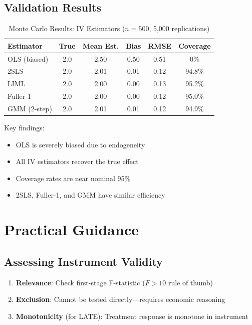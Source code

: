 \subsection{Validation Results}

\begin{table}[ht]
\centering
\caption{Monte Carlo Results: IV Estimators ($n=500$, 5,000 replications)}
\label{tab:iv_mc}
\begin{tabular}{lccccc}
\toprule
\textbf{Estimator} & \textbf{True} & \textbf{Mean Est.} & \textbf{Bias} & \textbf{RMSE} & \textbf{Coverage} \\
\midrule
OLS (biased) & 2.0 & 2.50 & 0.50 & 0.51 & 0\% \\
2SLS & 2.0 & 2.01 & 0.01 & 0.12 & 94.8\% \\
LIML & 2.0 & 2.00 & 0.00 & 0.13 & 95.2\% \\
Fuller-1 & 2.0 & 2.00 & 0.00 & 0.12 & 95.0\% \\
GMM (2-step) & 2.0 & 2.01 & 0.01 & 0.12 & 94.9\% \\
\bottomrule
\end{tabular}
\end{table}

Key findings:
\begin{itemize}
    \item OLS is severely biased due to endogeneity
    \item All IV estimators recover the true effect
    \item Coverage rates are near nominal 95\%
    \item 2SLS, Fuller-1, and GMM have similar efficiency
\end{itemize}


\section{Practical Guidance}
\label{sec:iv_guidance}

\subsection{Assessing Instrument Validity}

\begin{enumerate}
    \item \textbf{Relevance}: Check first-stage F-statistic ($F > 10$ rule of thumb)
    \item \textbf{Exclusion}: Cannot be tested directly---requires economic reasoning
    \item \textbf{Monotonicity} (for LATE): Treatment response is monotone in instrument
\end{enumerate}


